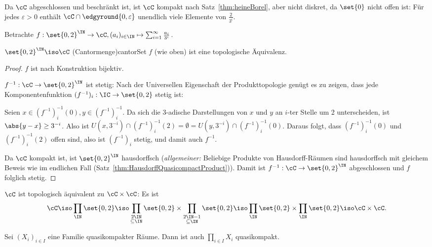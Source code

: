 \documentclass[language=ngerman]{TemplateLecture} %
\begin{document}
Da $\cC$ abgeschlossen und beschränkt ist, ist $\cC$ kompakt nach Satz~\ref{thm:heineBorel}, aber nicht diskret, da $\set{0}$ nicht offen ist: Für jedes $\varepsilon > 0$ enthält $\cC \cap \edgyround{0,\varepsilon}$ unendlich viele Elemente von $\frac{2}{3^i}$.

Betrachte $f: \set{0,2}^\IN \to \cC, (a_i)_{i \in \IN} \mapsto \sum_{i = 1}^\infty \frac{a_i}{3^i}$.
\begin{thm}{$\set{0,2}^\IN \iso \cC$ (Cantormenge)}{cantorSet}
    $f$ (wie oben) ist eine topologische Äquivalenz.
\end{thm}
\begin{proof}
    $f$ ist nach Konstruktion bijektiv.

    $f^{-1}: \cC \to \set{0,2}^\IN$ ist stetig: Nach der Universellen Eigenschaft der Produkttopologie genügt es zu zeigen, dass jede Komponentenfunktion $(f^{-1})_i: \IC \to \set{0,2}$ stetig ist:

    Seien $x \in \left(f^{-1}\right)_i^{-1}(0), y \in \left(f^{-1}\right)_i^{-1}$. Da sich die 3-adische Darstellungen von $x$ und $y$ an $i$-ter Stelle um 2 unterscheiden, ist $\abs{y-x} \geq 3^{-i}$. Also ist $U(x, 3^{-i}) \cap \left(f^{-1}\right)_i^{-1}(2) = \emptyset = U(y, 3^{-i}) \cap \left(f^{-1}\right)_i^{-1}(0)$. Daraus folgt, dass $\left(f^{-1}\right)_i^{-1}(0)$ und $\left(f^{-1}\right)_i^{-1}(2)$ offen sind, also ist $(f^{-1})_i$ stetig, und damit auch $f^{-1}$.

    Da $\cC$ kompakt ist, ist $\set{0,2}^\IN$ hausdorffsch (\emph{allgemeiner:} Beliebige Produkte von Hausdorff-Räumen sind hausdorffsch mit gleichem Beweis wie im endlichen Fall (Satz~\ref{thm:HausdorffQuasicompactProduct})). Damit ist $f^{-1}: \cC \to \set{0,2}^\IN$ abgeschlossen und $f$ folglich stetig.
\end{proof}




\begin{remark}
    $\cC$ ist topologisch äquivalent zu $\cC \times \cC$: Es ist 
    \begin{equation*}
        \cC \iso \prod_\IN \set{0,2} \iso \prod_{\substack{2\IN \\ \subseteq \IN}} \set{0,2} \times \prod_{\substack{2\IN - 1 \\ \subseteq \IN}} \set{0,2} \iso \prod_\IN \set{0,2} \times \prod_\IN \set{0,2} \iso \cC \times \cC.    
    \end{equation*}
\end{remark}
\begin{remark}
    Sei $(X_i)_{i \in I}$ eine Familie quasikompakter Räume. Dann ist auch $\prod_{i \in I} X_i$ quasikompakt.
\end{remark}
\end{document}
